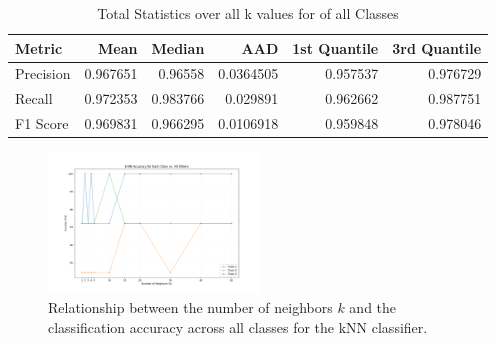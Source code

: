 \documentclass[9pt,technote]{IEEEtran}
\begin{document}
\begin{table}[h]
    \centering
    \caption{Total Statistics over all k values for of all Classes}
    \begin{tabular}{@{}lrrrrr@{}}
        \toprule
		Metric    & Mean &  Median  & AAD &  1st Quantile &  3rd Quantile \\
		\midrule
		Precision & 0.967651 & 0.96558 & 0.0364505 & 0.957537 & 0.976729 \\
		
		Recall &  0.972353 & 0.983766 & 0.029891 &  0.962662 &  0.987751  \\
		
		F1 Score & 0.969831 & 0.966295 & 0.0106918 & 0.959848 & 0.978046 \\
		\bottomrule
	\end{tabular}
	\label{tab::allclassesstatistics}
\end{table}

\begin{figure}[h!]
	\centering
	\includegraphics[width=0.5\textwidth]{accuracy.png}
	\caption{Relationship between the number of neighbors $k$ and the classification accuracy across all classes for the kNN classifier.}
	\label{fig::accuracy}
\end{figure}
\end{document}
